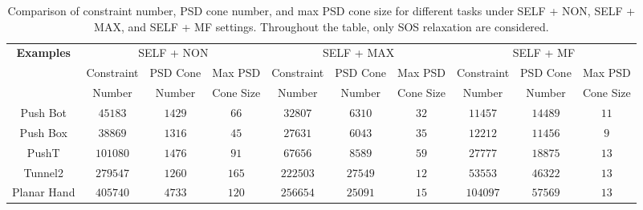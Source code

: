 \begin{table*}[t]
    \centering
    \begin{adjustbox}{width=0.95\linewidth}
    \begin{tabular}{|c|ccc|ccc|ccc|}
    \hline
    \multirow{2}{*}{\textbf{Examples}} 
               & \multicolumn{3}{c|}{SELF + NON}                             
               & \multicolumn{3}{c|}{SELF + MAX}                             
               & \multicolumn{3}{c|}{SELF + MF}                              \\ \cline{2-10} 
               & Constraint & PSD Cone    & Max PSD          
               & Constraint & PSD Cone    & Max PSD
               & Constraint & PSD Cone    & Max PSD         \\ 
               & Number     & Number      & Cone Size        
               & Number     & Number      & Cone Size           
               & Number     & Number      & Cone Size         \\ \hline
    Push Bot    & $45183$   & $1429$        & $66$           
               & $32807$   & $6310$        & $32$           
               & $11457$  & $14489$        & $11$            \\ \hline
    Push Box    & $38869$   & $1316$        & $45$                
               & $27631$   & $6043$        & $35$                 
               & $12212$  & $11456$        & $9$                 \\ \hline
    PushT      & $101080$   & $1476$        & $91$           
               & $67656$  & $8589$        & $59$           
               & $27777$  & $18875$        & $13$            \\ \hline
    Tunnel2    & $279547$   & $1260$        & $165$          
               & $222503$   & $27549$        & $12$          
               & $53553$   & $46322$        & $13$           \\ \hline
    Planar Hand & $405740$  & $4733$        & $120$                 
               & $256654$  & $25091$        & $15$                
               & $104097$  & $57569$        & $13$                 \\ \hline
    \end{tabular}
    \end{adjustbox}
    \caption{Comparison of constraint number, PSD cone number, and max PSD cone size for different tasks under SELF + NON, SELF + MAX, and SELF + MF settings. Throughout the table, only SOS relaxation are considered.}
    \label{tab:sdp-config}
\end{table*}